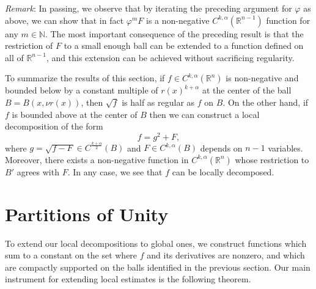 \documentclass[oneside,hidelinks,indentfirst,10pt]{book}
\begin{document}
\textit{Remark}: In passing, we observe that by iterating the preceding argument for \(\varphi\) as above, we can show that in fact \(\varphi^mF\) is a non-negative \(C^{k,\alpha}(\mathbb{R}^{n-1})\) function for any \(m\in\mathbb{N}\). The most important consequence of the preceding result is that the restriction of \(F\) to a small enough ball can be extended to a function defined on all of \(\mathbb{R}^{n-1}\), and this extension can be achieved without sacrificing regularity.


To summarize the results of this section, if \(f\in C^{k,\alpha}(\mathbb{R}^n)\) is non-negative and bounded below by a constant multiple of \(r(x)^{k+\alpha}\) at the center of the ball \(B=B(x,\nu r(x))\), then \(\sqrt{f}\) is half as regular as \(f\) on \(B\). On the other hand, if \(f\) is bounded above at the center of \(B\) then we can construct a local decomposition of the form
\[
    f=g^2+F,
\]
where \(g=\sqrt{f-F}\in C^\frac{k+\alpha}{2}(B)\) and \(F\in C^{k,\alpha}(B)\) depends on \(n-1\) variables. Moreover, there exists a non-negative function in \(C^{k,\alpha}(\mathbb{R}^n)\) whose restriction to \(B'\) agrees with \(F\). In any case, we see that \(f\) can be locally decomposed.


\section{Partitions of Unity}\label{sec:pou}


To extend our local decompositions to global ones, we construct functions which sum to a constant on the set where \(f\) and its derivatives are nonzero, and which are compactly supported on the balls identified in the previous section. Our main instrument for extending local estimates is the following theorem.
\end{document}
